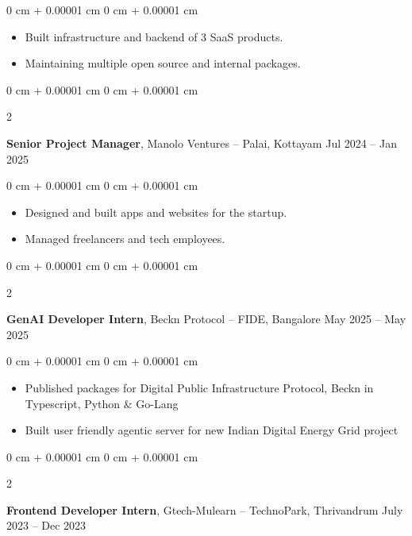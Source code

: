 \documentclass[10pt, letterpaper]{article}
\newenvironment{highlights}{
    \begin{itemize}[
        topsep=0.10 cm,
        parsep=0.10 cm,
        partopsep=0pt,
        itemsep=0pt,
        leftmargin=0 cm + 10pt
    ]
}{
    \end{itemize}
} %
\newenvironment{onecolentry}{
    \begin{adjustwidth}{
        0 cm + 0.00001 cm
    }{
        0 cm + 0.00001 cm
    }
}{
    \end{adjustwidth}
} %
\newenvironment{twocolentry}[2][]{
    \onecolentry
    \def\secondColumn{#2}
    \setcolumnwidth{\fill, 4.5 cm}
    \begin{paracol}{2}
}{
    \switchcolumn \raggedleft \secondColumn
    \end{paracol}
    \endonecolentry
} %
\begin{document}
\vspace{0.10 cm}
\begin{onecolentry}
	\begin{highlights}
		\item Built infrastructure and backend of 3 SaaS products.
		\item Maintaining multiple open source and internal packages.
	\end{highlights}
\end{onecolentry}

\vspace{0.2 cm}

\begin{twocolentry}{
		Jul 2024 – Jan 2025
	}
	\textbf{Senior Project Manager}, Manolo Ventures -- Palai, Kottayam\end{twocolentry}

\vspace{0.10 cm}
\begin{onecolentry}
	\begin{highlights}
		\item Designed and built apps and websites for the startup.
		\item Managed freelancers and tech employees.
	\end{highlights}
\end{onecolentry}

\vspace{0.2 cm}

\begin{twocolentry}{
		May 2025 – May 2025
	}
	\textbf{GenAI Developer Intern}, Beckn Protocol -- FIDE, Bangalore\end{twocolentry}

\vspace{0.10 cm}
\begin{onecolentry}
	\begin{highlights}
		\item Published packages for Digital Public Infrastructure Protocol, Beckn in Typescript, Python \& Go-Lang
		\item Built user friendly agentic server for new Indian Digital Energy Grid project
	\end{highlights}
\end{onecolentry}

\vspace{0.2 cm}

\begin{twocolentry}{
		July 2023 – Dec 2023
	}
	\textbf{Frontend Developer Intern}, Gtech-Mulearn -- TechnoPark, Thrivandrum\end{twocolentry}
\end{document}

